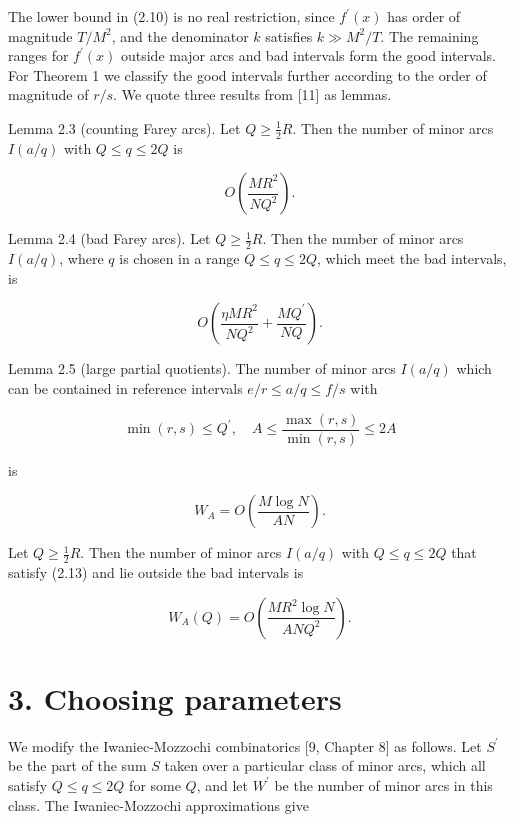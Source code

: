 \documentclass[10pt]{article}
\begin{document}
The lower bound in (2.10) is no real restriction, since $f^{\prime}(x)$ has order of magnitude $T / M^{2}$, and the denominator $k$ satisfies $k \gg M^{2} / T$. The remaining ranges for $f^{\prime}(x)$ outside major arcs and bad intervals form the good intervals. For Theorem 1 we classify the good intervals further according to the order of magnitude of $r / s$. We quote three results from [11] as lemmas.

Lemma 2.3 (counting Farey arcs). Let $Q \geqslant \frac{1}{2} R$. Then the number of minor arcs $I(a / q)$ with $Q \leqslant q \leqslant 2 Q$ is


\begin{equation*}
O\left(\frac{M R^{2}}{N Q^{2}}\right). \tag{2.11}
\end{equation*}


Lemma 2.4 (bad Farey arcs). Let $Q \geqslant \frac{1}{2} R$. Then the number of minor arcs $I(a / q)$, where $q$ is chosen in a range $Q \leqslant q \leqslant 2 Q$, which meet the bad intervals, is


\begin{equation*}
O\left(\frac{\eta M R^{2}}{N Q^{2}}+\frac{M Q^{\prime}}{N Q}\right). \tag{2.12}
\end{equation*}


Lemma 2.5 (large partial quotients). The number of minor arcs $I(a / q)$ which can be contained in reference intervals $e / r \leqslant a / q \leqslant f / s$ with


\begin{equation*}
\min (r, s) \leqslant Q^{\prime}, \quad A \leqslant \frac{\max (r, s)}{\min (r, s)} \leqslant 2 A \tag{2.13}
\end{equation*}


is


\begin{equation*}
W_{A}=O\left(\frac{M \log N}{A N}\right). \tag{2.14}
\end{equation*}


Let $Q \geqslant \frac{1}{2} R$. Then the number of minor arcs $I(a / q)$ with $Q \leqslant q \leqslant 2 Q$ that satisfy (2.13) and lie outside the bad intervals is


\begin{equation*}
W_{A}(Q)=O\left(\frac{M R^{2} \log N}{A N Q^{2}}\right). \tag{2.15}
\end{equation*}


\section*{3. Choosing parameters}
We modify the Iwaniec-Mozzochi combinatorics [9, Chapter 8] as follows. Let $S^{\prime}$ be the part of the sum $S$ taken over a particular class of minor arcs, which all satisfy $Q \leqslant q \leqslant 2 Q$ for some $Q$, and let $W^{\prime}$ be the number of minor arcs in this class. The Iwaniec-Mozzochi approximations give
\end{document}
